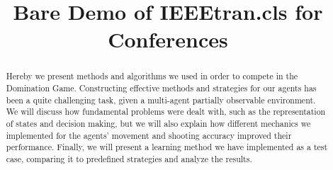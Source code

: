 \documentclass[conference]{IEEEtran}
\begin{document}
\title{Bare Demo of IEEEtran.cls for Conferences}

\author{
\and
{}
\and
{}
}

\maketitle


\begin{abstract}
Hereby we present methods and algorithms we used in order to compete in the Domination Game. Constructing effective methods and strategies for our agents has been a quite challenging task, given a multi-agent partially observable environment. We will discuss how fundamental problems were dealt with, such as the representation of states and decision making, but we will also explain how different mechanics we implemented for the agents’ movement and shooting accuracy improved their performance. Finally, we will present a learning method we have implemented as a test case, comparing it to predefined strategies and analyze the results. 
\end{abstract}

\IEEEpeerreviewmaketitle
\end{document}
